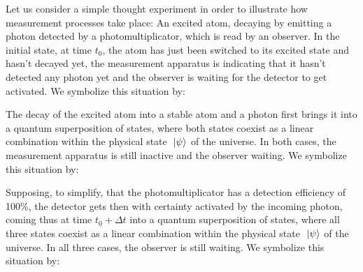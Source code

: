 \documentclass[10pt,a4paper,twoside,openany]{book}
\begin{document}
Let us consider a simple thought experiment in order to illustrate how measurement processes take place: An excited atom, decaying by emitting a photon detected by a photomultiplicator, which is read by an observer. In the initial state, at time $t_0$, the atom has just been switched to its excited state and hasn't decayed yet, the measurement apparatus is indicating that it hasn't detected any photon yet and the observer is waiting for the detector to get activated. We symbolize this situation by:
\begin{flushleft}
\ExcitedAtom\hspace*{3mm}\DetectorOff\hspace*{3mm}\ObserverOff
\end{flushleft}
The decay of the excited atom into a stable atom and a photon first brings it into a quantum superposition of states, where both states coexist as a linear combination within the physical state $\ \left|{\psi}\right\rangle$ of the universe. In both cases, the measurement apparatus is still inactive and the observer waiting. We symbolize this situation by:
\begin{flushleft}
\ExcitedAtom\hspace*{3mm}\DetectorOff\hspace*{3mm}\ObserverOff
\hspace*{3mm}\Superposition\hspace*{3mm}
\Atom\hspace*{3mm}\Photon\hspace*{3mm}\DetectorOff\hspace*{3mm}\ObserverOff
\end{flushleft}
Supposing, to simplify, that the photomultiplicator has a detection efficiency of 100\%, the detector gets then with certainty activated by the incoming photon, coming thus at time $t_0 + \Delta t$ into a quantum superposition of states, where all three states coexist as a linear combination within the physical state $\ \left|{\psi}\right\rangle$ of the universe. In all three cases, the observer is still waiting. We symbolize this situation by:
\begin{flushleft}
\ExcitedAtom\hspace*{3mm}\DetectorOff\hspace*{3mm}\ObserverOff
\hspace*{3mm}\Superposition\hspace*{3mm}
\Atom\hspace*{3mm}\Photon\hspace*{3mm}\DetectorOff\hspace*{3mm}\ObserverOff
\hspace*{3mm}\Superposition\hspace*{3mm}
\Atom\hspace*{3mm}\DetectorOn\hspace*{3mm}\ObserverOff
\end{flushleft}
\end{document}
